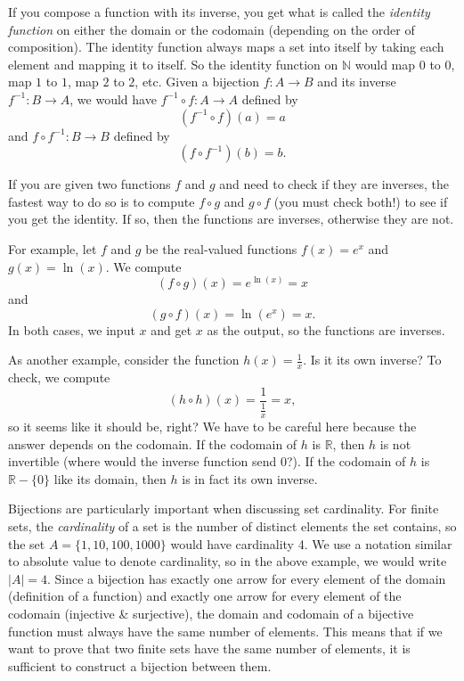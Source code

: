 \documentclass[11pt,oneside]{book}
\theoremstyle{definition}
\begin{document}
If you compose a function with its inverse, you get what is called the \emph{identity function} on either the domain or the codomain (depending on the order of composition).
The identity function always maps a set into itself by taking each element and mapping it to itself.
So the identity function on $\mathbb{N}$ would map $0$ to $0$, map $1$ to $1$, map $2$ to $2$, etc.
Given a bijection $f: A \to B$ and its inverse $f^{-1}: B \to A$, we would have $f^{-1} \circ f: A \to A$ defined by
\[ (f^{-1} \circ f)(a) = a \]
and $f \circ f^{-1}: B \to B$ defined by
\[ (f \circ f^{-1})(b) = b. \]

If you are given two functions $f$ and $g$ and need to check if they are inverses, the fastest way to do so is to compute $f \circ g$ and $g \circ f$ (you must check both!) to see if you get the identity.
If so, then the functions are inverses, otherwise they are not.

For example, let $f$ and $g$ be the real-valued functions $f(x) = e^{x}$ and $g(x) = \ln(x)$.
We compute
\[ (f \circ g)(x) = e^{\ln(x)} = x \]
and
\[ (g \circ f)(x) = \ln(e^{x}) = x. \]
In both cases, we input $x$ and get $x$ as the output, so the functions are inverses.

As another example, consider the function $h(x) = \frac{1}{x}$.
Is it its own inverse?
To check, we compute
\[ (h \circ h)(x) = \frac{1}{\frac{1}{x}} = x, \]
so it seems like it should be, right?
We have to be careful here because the answer depends on the codomain.
If the codomain of $h$ is $\mathbb{R}$, then $h$ is not invertible (where would the inverse function send 0?).
If the codomain of $h$ is $\mathbb{R} - \{ 0 \}$ like its domain, then $h$ is in fact its own inverse.

Bijections are particularly important when discussing set cardinality.
For finite sets, the \emph{cardinality} of a set is the number of distinct elements the set contains, so the set $A = \{ 1, 10, 100, 1000 \}$ would have cardinality 4.
We use a notation similar to absolute value to denote cardinality, so in the above example, we would write $|A| = 4$.
Since a bijection has exactly one arrow for every element of the domain (definition of a function) and exactly one arrow for every element of the codomain (injective \& surjective), the domain and codomain of a bijective function must always have the same number of elements.
This means that if we want to prove that two finite sets have the same number of elements, it is sufficient to construct a bijection between them.
\end{document}
